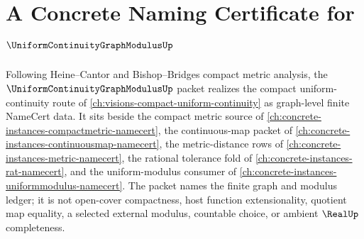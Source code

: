 \chapter{A Concrete Naming Certificate for $\UniformContinuityGraphModulusUp$}
\label{ch:concrete-instances-uniform-continuity-graph-modulus-namecert}

Following Heine--Cantor and Bishop--Bridges compact metric analysis, the $\UniformContinuityGraphModulusUp$ packet realizes the compact uniform-continuity route of \autoref{ch:visions-compact-uniform-continuity} as graph-level finite NameCert data. It sits beside the compact metric source of \autoref{ch:concrete-instances-compactmetric-namecert}, the continuous-map packet of \autoref{ch:concrete-instances-continuousmap-namecert}, the metric-distance rows of \autoref{ch:concrete-instances-metric-namecert}, the rational tolerance fold of \autoref{ch:concrete-instances-rat-namecert}, and the uniform-modulus consumer of \autoref{ch:concrete-instances-uniformmodulus-namecert}. The packet names the finite graph and modulus ledger; it is not open-cover compactness, host function extensionality, quotient map equality, a selected external modulus, countable choice, or ambient $\RealUp$ completeness.

